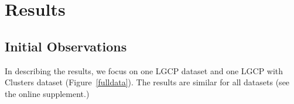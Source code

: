 \documentclass[review]{elsarticle}
\begin{document}
\section{Results}




\subsection{Initial Observations}

In describing the results, we focus on one LGCP dataset and one LGCP with
Clusters dataset (Figure~\ref{fulldata}). The results are similar for all
datasets (see the online supplement.)
\end{document}
